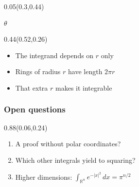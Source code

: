 \documentclass[aspectratio=169]{beamer}
\begin{document}
\begin{frame}[t]
\begin{textblock}{0.05}(0.3,0.44)
{\raggedright\fontsize{16}{19}\selectfont $\theta$\par}
\end{textblock}

\begin{textblock}{0.44}(0.52,0.26)
{\raggedright\fontsize{16}{19}\selectfont \begin{itemize}
\item The integrand depends on $r$ only
\item Rings of radius $r$ have length $2\pi r$
\item That extra $r$ makes it integrable
\end{itemize}\par}
\end{textblock}
\end{frame}

\begin{frame}[t]
  \frametitle{Open questions}

\begin{textblock}{0.88}(0.06,0.24)
{\raggedright\fontsize{19}{23}\selectfont \begin{enumerate}
\item A proof without polar coordinates?
\item Which other integrals yield to squaring?
\item Higher dimensions: $\int_{\mathbb{R}^n} e^{-|x|^2}\,dx = \pi^{n/2}$
\end{enumerate}\par}
\end{textblock}
\end{frame}
\end{document}
